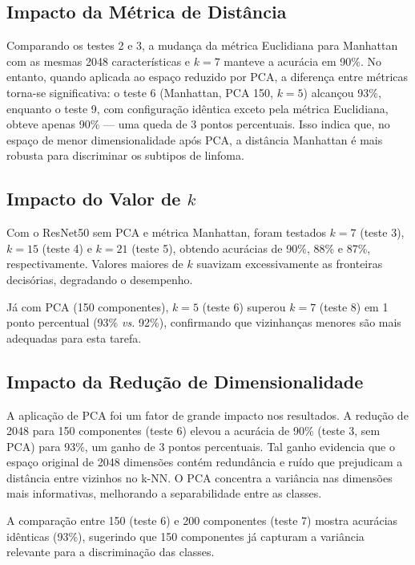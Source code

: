 \documentclass[10pt,twocolumn,letterpaper]{article}
\begin{document}
\subsection{Impacto da Métrica de Distância}

Comparando os testes 2 e 3, a mudança da métrica Euclidiana para Manhattan com as mesmas 2048 características e $k=7$ manteve a acurácia em 90\%. No entanto, quando aplicada ao espaço reduzido por PCA, a diferença entre métricas torna-se significativa: o teste 6 (Manhattan, PCA 150, $k=5$) alcançou 93\%, enquanto o teste 9, com configuração idêntica exceto pela métrica Euclidiana, obteve apenas 90\% --- uma queda de 3 pontos percentuais. Isso indica que, no espaço de menor dimensionalidade após PCA, a distância Manhattan é mais robusta para discriminar os subtipos de linfoma.

\subsection{Impacto do Valor de $k$}

Com o ResNet50 sem PCA e métrica Manhattan, foram testados $k=7$ (teste 3), $k=15$ (teste 4) e $k=21$ (teste 5), obtendo acurácias de 90\%, 88\% e 87\%, respectivamente. Valores maiores de $k$ suavizam excessivamente as fronteiras decisórias, degradando o desempenho. 

Já com PCA (150 componentes), $k=5$ (teste 6) superou $k=7$ (teste 8) em 1 ponto percentual (93\% \textit{vs.} 92\%), confirmando que vizinhanças menores são mais adequadas para esta tarefa.

\subsection{Impacto da Redução de Dimensionalidade}

A aplicação de PCA foi um fator de grande impacto nos resultados. A redução de 2048 para 150 componentes (teste 6) elevou a acurácia de 90\% (teste 3, sem PCA) para 93\%, um ganho de 3 pontos percentuais. Tal ganho evidencia que o espaço original de 2048 dimensões contém redundância e ruído que prejudicam a distância entre vizinhos no k-NN. O PCA concentra a variância nas dimensões mais informativas, melhorando a separabilidade entre as classes.

A comparação entre 150 (teste 6) e 200 componentes (teste 7) mostra acurácias idênticas (93\%), sugerindo que 150 componentes já capturam a variância relevante para a discriminação das classes.
\end{document}

